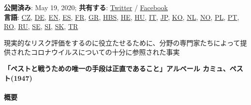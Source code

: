 \textbf{公開済み}: May 19, 2020; \textbf{共有する}:
\href{https://twitter.com/intent/tweet?url=https://swprs.org/covid19-facts-japanese/}{Twitter}
/
\href{https://www.facebook.com/share.php?u=https://swprs.org/covid19-facts-japanese/}{Facebook}\\
\textbf{言語}: \href{https://swprs.org/fakta-o-covid-19/}{CZ},
\href{https://swprs.org/covid-19-hinweis-ii/}{DE},
\href{https://swprs.org/a-swiss-doctor-on-covid-19/}{EN},
\href{https://swprs.org/hechos-sobre-covid-19/}{ES},
\href{https://swprs.org/coronavirus-un-medecin-suisse-parle/}{FR},
\href{https://swprs.org/facts-about-covid19-greek/}{GR},
\href{https://swprs.org/covid-19-cinjenice/}{HBS},
\href{https://yanivhamo.com/facts-about-covid-19-hebrew/}{HE},
\href{https://swprs.org/egy-svajci-orvos-a-covid-19-rol/}{HU},
\href{https://swprs.org/un-medico-svizzero-su-covid-19/}{IT},
\href{https://swprs.org/covid19-facts-japanese/}{JP},
\href{https://swprs.org/covid19-korean/}{KO},
\href{https://www.globalinfo.nl/Achtergrond/een-kritische-kijk-op-het-coronabeleid-transparantie-in-tijden-van-crisis}{NL},
\href{https://midtifleisen.wordpress.com/2020/03/14/en-sveitsisk-lege-om-covid-19/}{NO},
\href{https://swprs.org/szwajcarski-lekarz-o-covid-19/}{PL},
\href{https://swprs.org/fatos-sobre-covid-19/}{PT},
\href{https://swprs.org/informatii-despre-covid-19/}{RO},
\href{https://swprs.org/\%d0\%bd\%d0\%b0-\%d0\%ba\%d0\%be\%d0\%b2\%d0\%b8\%d0\%b4-19/}{RU},
\href{https://swprs.org/fakta-om-covid-19/}{SE},
\href{http://www.ninamvseeno.org/pregled-clanka.aspx?naslov=pomembne-informacije-o-novem-koronavirusu-covid-19\&id=148}{SI},
\href{https://alatyr.sk/covid-19_swiss_propaganda_research.htm}{SK},
\href{https://swprs.org/isvicreli-bir-doktordan-kovid-19-uezerine/}{TR}

現実的なリスク評価をするのに役立たせるために、分野の専門家たちによって提供されたコロナウイルスについての十分に参照された事実

\textbf{「ペストと戦うための唯一の手段は正直であること」アルベール
カミュ、ペスト(1947)}

\hypertarget{ux6982ux8981}{%
\paragraph{概要}\label{ux6982ux8981}}

